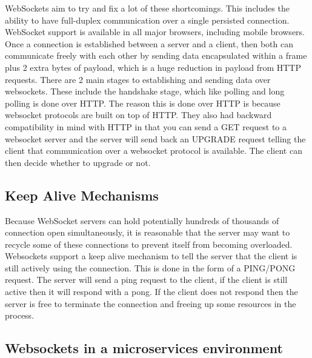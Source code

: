 WebSockets aim to try and fix a lot of these shortcomings. This includes the ability to have full-duplex communication over a single persisted connection. WebSocket support is available in all major browsers, including mobile browsers. Once a connection is established between a server and a client, then both can communicate freely with each other by sending data encapsulated within a frame plus 2 extra bytes of payload, which is a huge reduction in payload from HTTP requests. There are 2 main stages to establishing and sending data over websockets. These include the handshake stage, which like polling and long polling is done over HTTP. The reason this is done over HTTP is because websocket protocols are built on top of HTTP. They also had backward compatibility in mind with HTTP in that you can send a GET request to a websocket server and the server will send back an UPGRADE request telling the client that communication over a websocket protocol is available. The client can then decide whether to upgrade or not.

\subsection{Keep Alive Mechanisms}

Because WebSocket servers can hold potentially hundreds of thousands of connection open simultaneously, it is reasonable that the server may want to recycle some of these connections to prevent itself from becoming overloaded. Websockets support a keep alive mechanism to tell the server that the client is still actively using the connection. This is done in the form of a PING/PONG request. The server will send a ping request to the client, if the client is still active then it will respond with a pong. If the client does not respond then the server is free to terminate the connection and freeing up some resources in the process. 

\subsection{Websockets in a microservices environment}